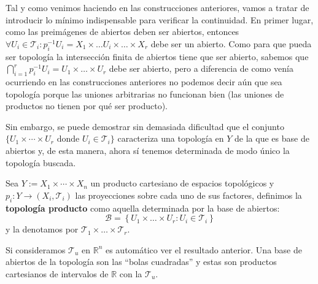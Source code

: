 Tal y como venimos haciendo en las construcciones anteriores, vamos a tratar de introducir lo mínimo indispensable para verificar la continuidad. En primer lugar, como las preimágenes de abiertos deben ser abiertos, entonces $\forall U_i \in \mathcal{T}_i : p_i^{-1}U_i = X_1 \times \ldots U_i \times \ldots \times X_r $ debe ser un abierto. Como para que pueda ser topología la intersección finita de abiertos tiene que ser abierto, sabemos que $\bigcap_{i=1}^{r} p_i^{-1}U_i = U_1 \times \ldots \times U_r$ debe ser abierto, pero a diferencia de como venía ocurriendo en las construcciones anteriores no podemos decir aún que sea topología porque las uniones arbitrarias no funcionan bien (las uniones de productos no tienen por qué ser producto). 

Sin embargo, se puede demostrar sin demasiada dificultad que el conjunto  $\{U_1 \times \cdots \times U_r \mbox{ donde } U_i \in \mathcal{T}_i\}$ caracteriza una topología en $Y$ de la que es base de abiertos y, de esta manera, ahora sí tenemos determinada de modo único la topología buscada.

\begin{defi}
Sea $Y := X_1\times \cdots \times X_n$ un producto cartesiano de espacios topológicos y $p_i : Y \rightarrow (X_i, \mathcal{T}_i)$ las proyecciones sobre cada uno de sus factores, definimos la \textbf{topología producto} como aquella determinada por la base de abiertos:
\[
\mathcal{B} = \left\{ U_1 \times \ldots \times U_r: U_i \in \mathcal{T}_i \right\}
\]
y la denotamos por $\mathcal{T}_1 \times \ldots \times \mathcal{T}_r$.
\end{defi}

\begin{ej}
Si consideramos $\mathcal{T}_u$ en $\mathbb{R}^n$ es automático ver el resultado anterior. Una base de abiertos de la topología son las ``bolas cuadradas'' y estas son productos cartesianos de intervalos de $\mathbb{R}$ con la $\mathcal{T}_u$.
\end{ej}

